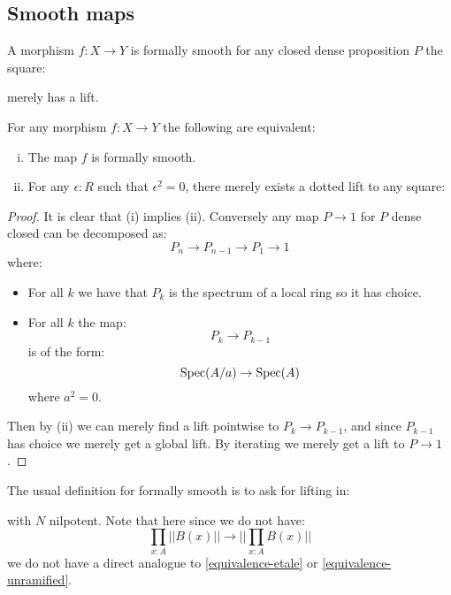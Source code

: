 
\subsection{Smooth maps}

\begin{definition}
A morphism $f:X\to Y$ is formally smooth for any closed dense proposition $P$ the square:
 \begin{center}
    \end{center}
merely has a lift.
\end{definition}

\begin{lemma}
For any morphism  $f:X\to Y$ the following are equivalent:
\begin{enumerate}[(i)]
\item The map $f$ is formally smooth. 
\item For any $\epsilon:R$ such that $\epsilon^2=0$, there merely exists a dotted lift to any square:
 \begin{center}
    \end{center}
\end{enumerate}
\end{lemma}

\begin{proof}
It is clear that (i) implies (ii). Conversely any map $P\to 1$ for $P$ dense closed can be decomposed as:
\[P_n \to P_{n-1} \to P_1\to 1\]
where:
\begin{itemize}
\item For all $k$ we have that $P_k$ is the spectrum of a local ring so it has choice.
\item For all $k$ the map:
\[P_{k}\to P_{k-1}\]
is of the form:
\[\operatorname{Spec}(A/a)\to \operatorname{Spec}(A)\]
where $a^2=0$.
\end{itemize}
Then by (ii) we can merely find a lift pointwise to $P_k\to P_{k-1}$, and since $P_{k-1}$ has choice we merely get a global lift. By iterating we merely get a lift to $P\to 1$.
\end{proof}

\begin{remark}
The usual definition for formally smooth is to ask for lifting in:
 \begin{center}
    \end{center}
    with $N$ nilpotent. Note that here since we do not have: 
\[
\prod_{x:A} ||B(x)|| \to ||\prod_{x:A}B(x)||
\]
we do not have a direct analogue to \cref{equivalence-etale} or \cref{equivalence-unramified}.
\end{remark}

